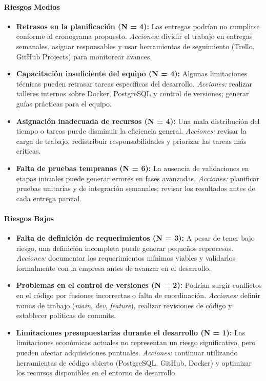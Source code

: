 \paragraph{Riesgos Medios}
\begin{itemize}
	\item \textbf{Retrasos en la planificación (N = 4):}
	      Las entregas podrían no cumplirse conforme al cronograma propuesto.
	      \textit{Acciones:} dividir el trabajo en entregas semanales, asignar responsables y usar herramientas de seguimiento (Trello, GitHub Projects) para monitorear avances.

	\item \textbf{Capacitación insuficiente del equipo (N = 4):}
	      Algunas limitaciones técnicas pueden retrasar tareas específicas del desarrollo.
	      \textit{Acciones:} realizar talleres internos sobre Docker, PostgreSQL y control de versiones; generar guías prácticas para el equipo.

	\item \textbf{Asignación inadecuada de recursos (N = 4):}
	      Una mala distribución del tiempo o tareas puede disminuir la eficiencia general.
	      \textit{Acciones:} revisar la carga de trabajo, redistribuir responsabilidades y priorizar las tareas más críticas.

	\item \textbf{Falta de pruebas tempranas (N = 6):}
	      La ausencia de validaciones en etapas iniciales puede generar errores en fases avanzadas.
	      \textit{Acciones:} planificar pruebas unitarias y de integración semanales; revisar los resultados antes de cada entrega parcial.
\end{itemize}

\paragraph{Riesgos Bajos}
\begin{itemize}
	\item \textbf{Falta de definición de requerimientos (N = 3):}
	      A pesar de tener bajo riesgo, una definición incompleta puede generar pequeños reprocesos.
	      \textit{Acciones:} documentar los requerimientos mínimos viables y validarlos formalmente con la empresa antes de avanzar en el desarrollo.

	\item \textbf{Problemas en el control de versiones (N = 2):}
	      Podrían surgir conflictos en el código por fusiones incorrectas o falta de coordinación.
	      \textit{Acciones:} definir ramas de trabajo (\textit{main}, \textit{dev}, \textit{feature}), realizar revisiones de código y establecer políticas de commits.

	\item \textbf{Limitaciones presupuestarias durante el desarrollo (N = 1):}
	      Las limitaciones económicas actuales no representan un riesgo significativo, pero pueden afectar adquisiciones puntuales.
	      \textit{Acciones:} continuar utilizando herramientas de código abierto (PostgreSQL, GitHub, Docker) y optimizar los recursos disponibles en el entorno de desarrollo.
\end{itemize}

